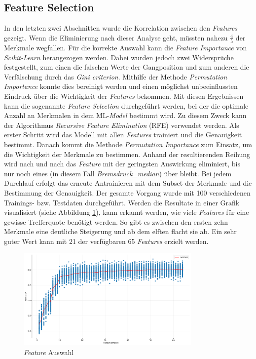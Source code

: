 \subsection{Feature Selection}
\label{sec:feature_selection}

In den letzten zwei Abschnitten wurde die Korrelation zwischen den \textit{Features} gezeigt. Wenn die Eliminierung nach dieser Analyse geht, müssten nahezu $\frac{4}{5}$ der Merkmale wegfallen. Für die korrekte Auswahl kann die \textit{Feature Importance} von \textit{Scikit-Learn} herangezogen werden. Dabei wurden jedoch zwei Widersprüche festgestellt, zum einen die falschen Werte der Gangposition und zum anderen die Verfälschung durch das \textit{Gini criterion}. Mithilfe der Methode \textit{Permutation Importance} konnte dies bereinigt werden und einen möglichst unbeeinflussten Eindruck über die Wichtigkeit der \textit{Features} bekommen. Mit diesen Ergebnissen kann die sogenannte \textit{Feature Selection} durchgeführt werden, bei der die optimale Anzahl an Merkmalen in dem ML-\textit{Model} bestimmt wird. Zu diesem Zweck kann der Algorithmus \textit{Recursive Feature Elimination} (RFE) \cite{Guyon2002} verwendet werden. Als erster Schritt wird das Modell mit allen \textit{Features} trainiert und die Genauigkeit bestimmt. Danach kommt die Methode \textit{Permutation Importance} zum Einsatz, um die Wichtigkeit der Merkmale zu bestimmen. Anhand der resultierenden Reihung wird nach und nach das \textit{Feature} mit der geringsten Auswirkung eliminiert, bis nur noch eines (in diesem Fall \textit{Bremsdruck\_median}) über bleibt. Bei jedem Durchlauf erfolgt das erneute Antrainieren mit dem Subset der Merkmale und die Bestimmung der Genauigkeit. Der gesamte Vorgang wurde mit 100 verschiedenen Trainings- bzw. Testdaten durchgeführt. Werden die Resultate in einer Grafik visualisiert (siehe Abbildung \ref{fig:feature_selection}), kann erkannt werden, wie viele \textit{Features} für eine gewisse Trefferquote benötigt werden. So gibt es zwischen den ersten zehn Merkmale eine deutliche Steigerung und ab dem elften flacht sie ab. Ein sehr guter Wert kann mit 21 der verfügbaren 65 \textit{Features} erzielt werden.

\begin{figure}[htbp]
  \centering
  \includegraphics[width=0.8\textwidth]{images/feature_selection.png}
  \caption{\textit{Feature} Auswahl}
  \label{fig:feature_selection}
\end{figure}